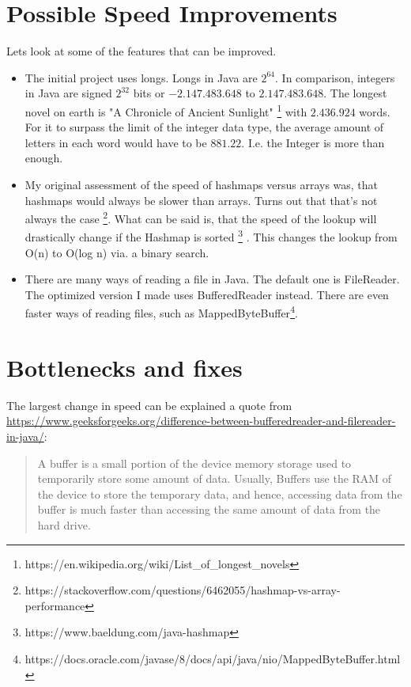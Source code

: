 \documentclass[a4paper, 12pt]{report}
\begin{document}
\chapter{Possible Speed Improvements}
Lets look at some of the features that can be improved.
\begin{itemize}
	\item The initial project uses longs. Longs in Java are $2^{64}$. In comparison, integers in Java are signed $2^{32}$ bits or $-2.147.483.648$ to $2.147.483.648$. The longest novel on earth is "A Chronicle of Ancient Sunlight" \footnote{{https://en.wikipedia.org/wiki/List\_of\_longest\_novels}}  with $2.436.924$ words. For it to surpass the limit of the integer data type, the average amount of letters in each word would have to be $881.22$. I.e. the Integer is more than enough.
	\item My original assessment of the speed of hashmaps versus arrays was, that hashmaps would always be slower than arrays. Turns out that that's not always the case \footnote{https://stackoverflow.com/questions/6462055/hashmap-vs-array-performance}. What can be said is, that the speed of the lookup will drastically change if the Hashmap is sorted \footnote{https://www.baeldung.com/java-hashmap} . This changes the lookup from O(n) to O(log n) via. a binary search. 
	\item There are many ways of reading a file in Java. The default one is FileReader. The optimized version I made uses BufferedReader instead. There are even faster ways of reading files, such as MappedByteBuffer\footnote{https://docs.oracle.com/javase/8/docs/api/java/nio/MappedByteBuffer.html}.
	
	
\end{itemize}
\chapter{Bottlenecks and fixes}

The largest change in speed can be explained a quote from 
\url{https://www.geeksforgeeks.org/difference-between-bufferedreader-and-filereader-in-java/}:

\begin{quote}
A buffer is a small portion of the device memory storage used to temporarily store some amount of data. Usually, Buffers use the RAM of the device to store the temporary data, and hence, accessing data from the buffer is much faster than accessing the same amount of data from the hard drive. 
\end{quote}
\end{document}
